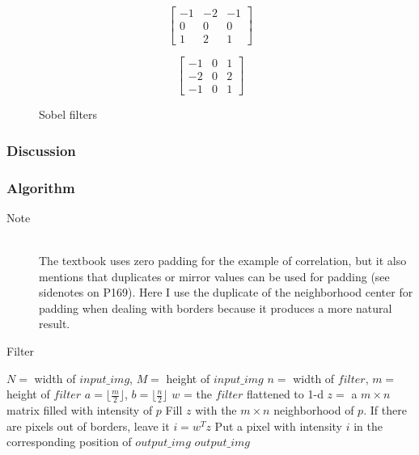 \documentclass{article}
\begin{document}
\begin{figure}[H]
	\centering
	\begin{minipage}[b]{0.20\linewidth}
		\[ \begin{bmatrix}
			-1 & -2 & -1 \\
			 0 &  0 &  0 \\
			 1 &  2 &  1
		\end{bmatrix} \]
		\end{minipage}
	\begin{minipage}[b]{0.20\linewidth}
		\[ \begin{bmatrix}
			-1 &  0 &  1 \\
		    -2 &  0 &  2 \\
			-1 &  0 &  1
		\end{bmatrix} \]
	\end{minipage}
	\caption{Sobel filters}
\end{figure}
\subsubsection{Discussion}

\subsubsection{Algorithm}

\begin{description}
\item[Note] \hfill \\
The textbook uses zero padding for the example of correlation, but it also mentions that duplicates or mirror values can be used for padding (see sidenotes on P169). Here I use the duplicate of the neighborhood center for padding when dealing with borders because it produces a more natural result.

\end{description}

\begin{algorithm}[H]
\centering
\caption{Filter}
  \begin{algorithmic}[1]
     \State $N = $ width of $input\_img$, $M = $ height of $input\_img$
     \State $n = $ width of $filter$, $m = $ height of $filter$
     \State $a = \lfloor{\frac{m}{2}}\rfloor$, $b = \lfloor{\frac{n}{2}}\rfloor$
     \State $w$ = the $filter$ flattened to 1-d
     	\State $z = $ a $m \times n$ matrix filled with intensity of $p$
     	\State Fill $z$ with the $m \times n$ neighborhood of $p$. If there are pixels out of borders, leave it
     	\State $i = w^{T}z$
     	\State Put a pixel with intensity $i$ in the corresponding position of $output\_img$
     \EndFor
     \State \Return $output\_img$ 
    \EndFunction
  \end{algorithmic}
\end{algorithm}


\end{document}
